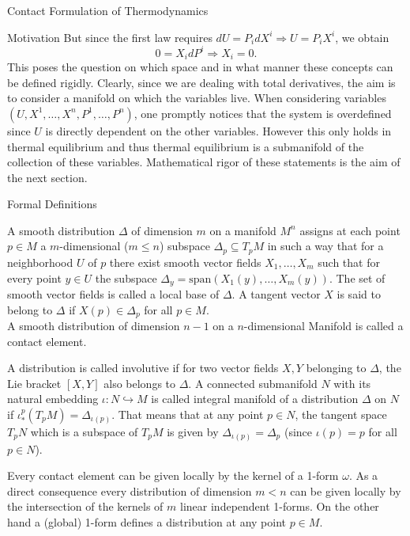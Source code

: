 \begin{section}{Contact Formulation of Thermodynamics}
\begin{subsection}{Motivation}
But since the first law requires $dU=P_idX^i\Rightarrow U = P_iX^i$, we obtain
\begin{equation}
	0 = X_idP^i \Rightarrow X_i = 0.
\end{equation}
This poses the question on which space and in what manner these concepts can be defined rigidly. Clearly, since we are dealing with total derivatives, the aim is to consider a manifold on which the variables live. When considering variables $(U,X^1,\dots,X^n,P^1,\dots,P^n)$, one promptly notices that the system is overdefined since $U$ is directly dependent on the other variables. However this only holds in thermal equilibrium and thus thermal equilibrium is a submanifold of the collection of these variables. Mathematical rigor of these statements is the aim of the next section.
\end{subsection}
\newpage
%
%
%
\begin{subsection}{Formal Definitions}
\begin{definition}
	A smooth distribution $\Delta$ of dimension $m$ on a manifold $M^n$ assigns at each point $p\in M$ a $m$-dimensional ($m\leq n$) subspace $\Delta_p\subseteq T_pM$ in such a way that for a neighborhood $U$ of $p$ there exist smooth vector fields $X_1,\dots,X_m$ such that for every point $y\in U$ the subspace $\Delta_y=\text{span}(X_1(y),\dots,X_m(y))$. The set of smooth vector fields is called a local base of $\Delta$. A tangent vector $X$ is said to belong to $\Delta$ if $X(p)\in\Delta_p$ for all $p\in M$.\\
	A smooth distribution of dimension $n-1$ on a $n$-dimensional Manifold is called a contact element.
\end{definition}
\begin{definition}
	A distribution is called involutive if for two vector fields $X,Y$ belonging to $\Delta$, the Lie bracket $[X,Y]$ also belongs to $\Delta$. A connected submanifold $N$ with its natural embedding $\iota:N\hookrightarrow M$ is called integral manifold of a distribution $\Delta$ on $N$ if $\iota_*^p(T_pM)=\Delta_{\iota(p)}$. That means that at any point $p\in N$, the tangent space $T_pN$ which is a subspace of $T_pM$ is given by $\Delta_{\iota(p)}=\Delta_p$ (since $\iota(p)=p$ for all $p\in N$).
\end{definition}
\begin{corollary}
	Every contact element can be given locally by the kernel of a 1-form $\omega$. As a direct consequence every distribution of dimension $m<n$ can be given locally by the intersection of the kernels of $m$ linear independent 1-forms. On the other hand a (global) 1-form defines a distribution at any point $p\in M$.

\end{corollary}
\end{subsection}
\end{section}
